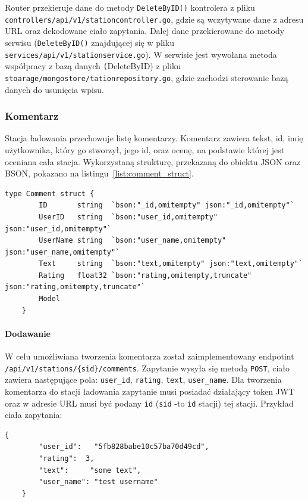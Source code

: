 Router przekieruje dane do metody \texttt{DeleteByID()} kontrolera z pliku \texttt{controllers/api/v1/stationcontroller.go}, gdzie są wczytywane dane z adresu URL oraz dekodowane ciało zapytania. Dalej dane przekierowane do metody serwisu (\texttt{DeleteByID()} znajdującej się w pliku \texttt{services/api/v1/stationservice.go}).
W serwisie jest wywołana metoda współpracy z bazą danych \texttt(DeleteByID) z pliku \texttt{stoarage/mongostore/tationrepository.go}, gdzie zachodzi sterowanie bazą danych do usunięcia wpisu.
\subsubsection{Komentarz} %
Stacja ładowania przechowuje listę komentarzy. Komentarz zawiera tekst, id, imię użytkownika, który go stworzył, jego id, oraz ocenę, na podstawie której jest oceniana cała stacja. Wykorzystaną strukturę, przekazaną do obiektu JSON oraz BSON, pokazano na listingu~\ref{list:comment_struct}.
\begin{lstlisting}[label=list:comment_struct,caption=Struktura komentarza,basicstyle=\tiny\ttfamily]
    type Comment struct {
        ID       string  `bson:"_id,omitempty" json:"_id,omitempty"`
        UserID   string  `bson:"user_id,omitempty" json:"user_id,omitempty"`
        UserName string  `bson:"user_name,omitempty" json:"user_name,omitempty"`
        Text     string  `bson:"text,omitempty" json:"text,omitempty"`
        Rating   float32 `bson:"rating,omitempty,truncate" json:"rating,omitempty,truncate"`
        Model
    }
\end{lstlisting}

\paragraph{Dodawanie\newline}
W celu umożliwiana tworzenia komentarza został zaimplementowany endpotint \texttt{/api/v1/stations/\{sid\}/comments}.
Zapytanie wysyła się metodą \texttt{POST}, ciało zawiera następujące pola: \texttt{user\_id}, \texttt{rating}, \texttt{text}, \texttt{user\_name}.
Dla tworzenia komentarza do stacji ładowania zapytanie musi posiadać działający token JWT oraz w adresie URL musi być podany \texttt{id} (\texttt{sid} -to \texttt{id} stacji) tej stacji.
Przykład ciała zapytania:
\begin{lstlisting}[basicstyle=\tiny\ttfamily]
    {
		"user_id":   "5fb828babe10c57ba70d49cd",
		"rating":  3,
		"text":     "some text",
		"user_name": "test username"
    }
\end{lstlisting}

